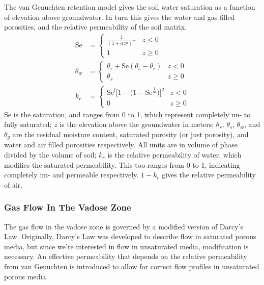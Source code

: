 The van Genuchten retention model gives the soil water saturation as a function of elevation above groundwater.
In turn this gives the water and gas filled porosities, and the relative permeability of the soil matrix.
\begin{align}
  \mathrm{Se} &=
    \begin{cases}\label{eq:van_genuchten_saturation}
      \frac{1}{(1 + \alpha z^n)^m} & z < 0 \\
    1 & z \geq 0
    \end{cases} \\
  \theta_w &=
    \begin{cases}\label{eq:van_genuchten_soil_moisture}
      \theta_r + \mathrm{Se}(\theta_s - \theta_r) & z < 0 \\
      \theta_s & z \geq 0
    \end{cases} \\
  k_r &=
    \begin{cases}\label{eq:van_genuchten_relative_permeability}
      \mathrm{Se}^l \big[ 1 - \big( 1 - \mathrm{Se}^\frac{1}{m} \big) \big]^2 & z < 0 \\
      0 & z \geq 0
    \end{cases}
\end{align}
$\mathrm{Se}$ is the saturation, and ranges from 0 to 1, which represent completely un- to fully saturated;
$z$ is the elevation above the groundwater in meters;
$\theta_r$, $\theta_s$, $\theta_w$, and $\theta_g$ are the residual moisture content, saturated porosity (or just porosity), and water and air filled porosities respectively. All units are in volume of phase divided by the volume of soil;
$k_r$ is the relative permeability of water, which modifies the saturated permeability. This too ranges from 0 to 1, indicating completely im- and permeable respectively. $1-k_r$ gives the relative permeability of air.\par

\subsubsection{Gas Flow In The Vadose Zone}\label{sec:darcy}

The gas flow in the vadose zone is governed by a modified version of Darcy's Law.
Originally, Darcy's Law was developed to describe flow in saturated porous media, but since we're interested in flow in unsaturated media, modification is necessary.
An effective permeability that depends on the relative permeability from van Genuchten is introduced to allow for correct flow profiles in unsaturated porous media.\par

